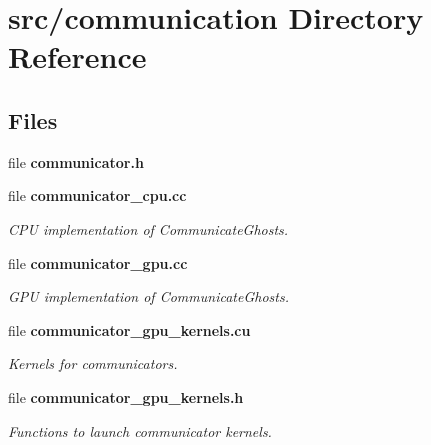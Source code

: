 \section{src/communication Directory Reference}
\label{dir_6d2104db64b91953bbd7b8fedbb8a094}
\subsection*{Files}
\begin{DoxyCompactItemize}
\item 
file {\bf communicator.\-h}
\item 
file {\bf communicator\-\_\-cpu.\-cc}
\begin{DoxyCompactList}\small\item\em C\-P\-U implementation of Communicate\-Ghosts. \end{DoxyCompactList}\item 
file {\bf communicator\-\_\-gpu.\-cc}
\begin{DoxyCompactList}\small\item\em G\-P\-U implementation of Communicate\-Ghosts. \end{DoxyCompactList}\item 
file {\bf communicator\-\_\-gpu\-\_\-kernels.\-cu}
\begin{DoxyCompactList}\small\item\em Kernels for communicators. \end{DoxyCompactList}\item 
file {\bf communicator\-\_\-gpu\-\_\-kernels.\-h}
\begin{DoxyCompactList}\small\item\em Functions to launch communicator kernels. \end{DoxyCompactList}\end{DoxyCompactItemize}
